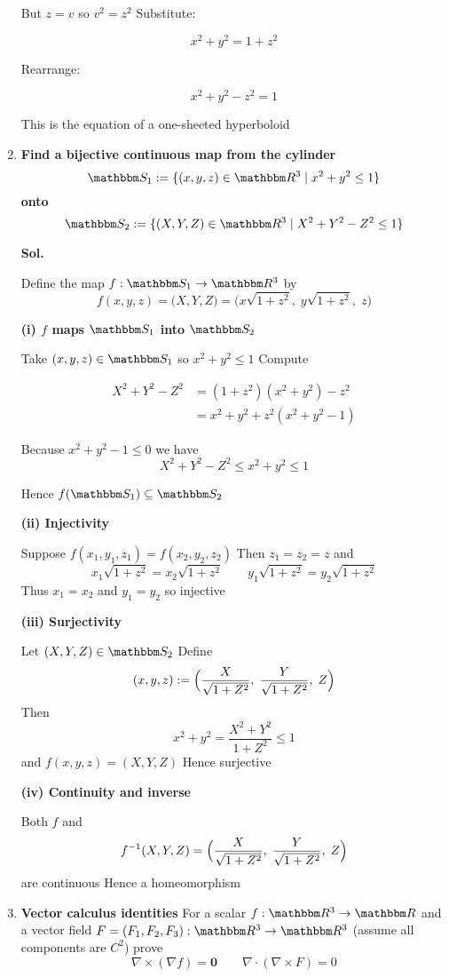 \documentclass[14pt]{extarticle}
\newcommand{\bb}{\mathbbm}
\begin{document}
\begin{enumerate}
But $z=v$ so $v^2=z^2$ Substitute:

\[
x^2 + y^2 = 1 + z^2
\]

Rearrange:

\[
x^2 + y^2 - z^2 = 1
\]

This is the equation of a one-sheeted hyperboloid

\newpage
\item \textbf{Find a bijective continuous map from the cylinder}
\[
\bb S_1 := \{(x,y,z)\in\bb R^3 \mid x^2+y^2 \le 1\}
\]
\textbf{onto}
\[
\bb S_2 := \{(X,Y,Z)\in\bb R^3 \mid X^2+Y^2-Z^2 \le 1\}
\]

\textbf{Sol.}

Define the map $f:\bb S_1\to\bb R^3$ by
\[
f(x,y,z) = \bigl(X,Y,Z\bigr) = \bigl(x\sqrt{1+z^2},\; y\sqrt{1+z^2},\; z\bigr)
\]

\textbf{(i) $f$ maps $\bb S_1$ into $\bb S_2$}

Take $(x,y,z)\in\bb S_1$ so $x^2+y^2\le 1$ Compute

\begin{align*}
X^2 + Y^2 - Z^2
&= (1+z^2)(x^2+y^2) - z^2 \\
&= x^2+y^2 + z^2(x^2+y^2 - 1)
\end{align*}

Because $x^2+y^2-1\le 0$ we have
\[
X^2+Y^2-Z^2 \le x^2+y^2 \le 1
\]

Hence $f(\bb S_1)\subseteq \bb S_2$

\medskip

\textbf{(ii) Injectivity}

Suppose $f(x_1,y_1,z_1)=f(x_2,y_2,z_2)$ Then $z_1=z_2=z$ and
\[
x_1\sqrt{1+z^2} = x_2\sqrt{1+z^2}\qquad
y_1\sqrt{1+z^2} = y_2\sqrt{1+z^2}
\]
Thus $x_1=x_2$ and $y_1=y_2$ so injective

\medskip

\textbf{(iii) Surjectivity}

Let $(X,Y,Z)\in\bb S_2$ Define
\[
(x,y,z) := \Bigl(\frac{X}{\sqrt{1+Z^2}},\; \frac{Y}{\sqrt{1+Z^2}},\; Z\Bigr)
\]
Then
\[
x^2+y^2 = \frac{X^2+Y^2}{1+Z^2} \le 1
\]
and $f(x,y,z)=(X,Y,Z)$ Hence surjective

\medskip

\textbf{(iv) Continuity and inverse}

Both $f$ and
\[
f^{-1}(X,Y,Z) = \Bigl(\frac{X}{\sqrt{1+Z^2}},\; \frac{Y}{\sqrt{1+Z^2}},\; Z\Bigr)
\]
are continuous Hence a homeomorphism

\newpage
\item \textbf{Vector calculus identities} For a scalar $f:\bb R^3\to\bb R$ and a vector field
$F=(F_1,F_2,F_3):\bb R^3\to\bb R^3$ (assume all components are $C^2$) prove
\[
\nabla\times(\nabla f)=\mathbf{0}\qquad
\nabla\cdot(\nabla\times F)=0
\]


\end{enumerate}
\end{document}
